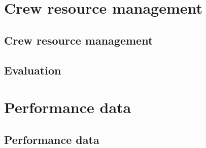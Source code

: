 \documentclass{book}
\begin{document}
\part{Crew resource management}
\chapter{Crew resource management}
\chapter{Evaluation}

\part{Performance data}
\chapter{Performance data}

\printindex

\end{document}
